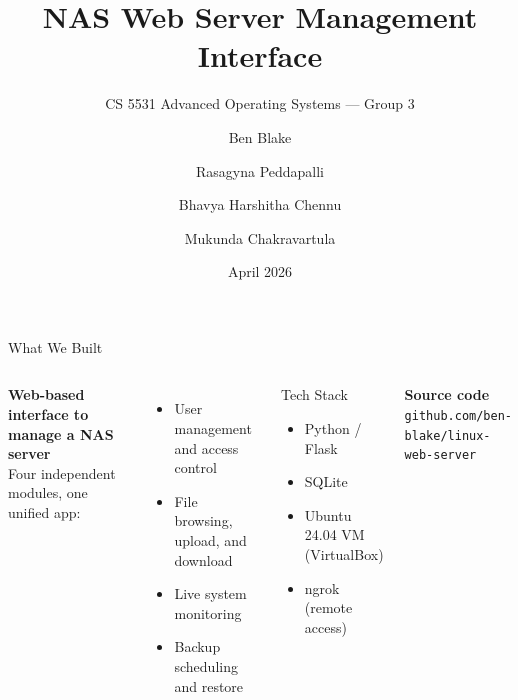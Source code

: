 \documentclass[aspectratio=169]{beamer}
\title{NAS Web Server Management Interface}
\subtitle{CS 5531 Advanced Operating Systems --- Group 3}
\author{
  Ben Blake \and
  Rasagyna Peddapalli \and
  Bhavya Harshitha Chennu \and
  Mukunda Chakravartula
}
\institute{University of Missouri -- Kansas City}
\date{April 2026}
\begin{document}

{
\begin{frame}
  \titlepage
\end{frame}
}

\begin{frame}{What We Built}
  \begin{columns}[T, onlytextwidth]
      \textbf{Web-based interface to manage a NAS server} \\[0.8em]
      Four independent modules, one unified app:
      \begin{itemize}
        \item User management and access control
        \item File browsing, upload, and download
        \item Live system monitoring
        \item Backup scheduling and restore
      \end{itemize}
      \begin{block}{Tech Stack}
        \begin{itemize}
          \item Python / Flask
          \item SQLite
          \item Ubuntu 24.04 VM (VirtualBox)
          \item ngrok (remote access)
        \end{itemize}
      \end{block}
      \vspace{0.8em}
      \textbf{Source code} \\
      {\small \texttt{github.com/ben-blake/linux-web-server}}
  \end{columns}
\end{frame}
\end{document}
